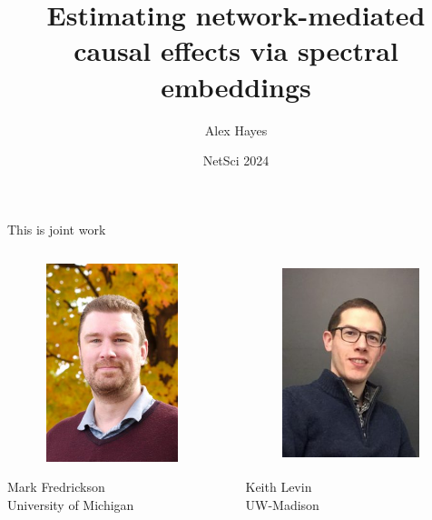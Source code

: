 \documentclass[aspectratio=169]{beamer}
\title{Estimating network-mediated causal effects via
spectral embeddings}
\date{NetSci 2024}
\author{Alex Hayes}
\institute{Department of Statistics \\ University of Wisconsin-Madison}
\theoremstyle{remark}
\begin{document}
\maketitle

\begin{frame}{This is joint work}
    \begin{columns}
        \centering
        \begin{column}{0.5\textwidth}
            \begin{figure}
                \includegraphics[width=4cm, height=5.75cm]{./figures/mark.jpg}
            \end{figure}
            \centering
            Mark Fredrickson \\
            University of Michigan
        \end{column}
        \begin{column}{0.5\textwidth}
            \centering
            \begin{figure}
                \includegraphics[width=4cm, height=5.75cm]{./figures/keith.jpg}
            \end{figure}
            Keith Levin \\
            UW-Madison
        \end{column}
    \end{columns}
\end{frame}
\end{document}
